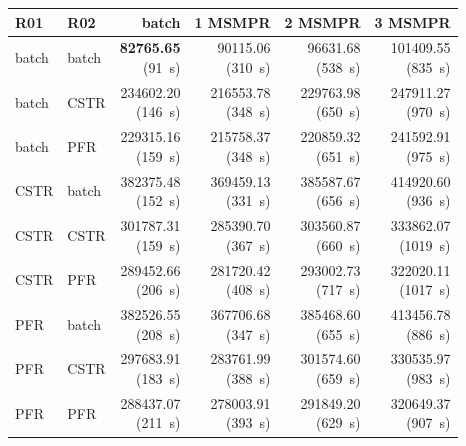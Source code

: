 \begin{tabular}{@{}llrrrr@{}}\toprule
R01 & R02 & batch & 1 MSMPR & 2 MSMPR & 3 MSMPR\\\midrule
batch & batch & \makecell{\textbf{82765.65}\\(91~s)} & \makecell{90115.06\\(310~s)} & \makecell{96631.68\\(538~s)} & \makecell{101409.55\\(835~s)} \\
batch & CSTR & \makecell{234602.20\\(146~s)} & \makecell{216553.78\\(348~s)} & \makecell{229763.98\\(650~s)} & \makecell{247911.27\\(970~s)} \\
batch & PFR & \makecell{229315.16\\(159~s)} & \makecell{215758.37\\(348~s)} & \makecell{220859.32\\(651~s)} & \makecell{241592.91\\(975~s)} \\
CSTR & batch & \makecell{382375.48\\(152~s)} & \makecell{369459.13\\(331~s)} & \makecell{385587.67\\(656~s)} & \makecell{414920.60\\(936~s)} \\
CSTR & CSTR & \makecell{301787.31\\(159~s)} & \makecell{285390.70\\(367~s)} & \makecell{303560.87\\(660~s)} & \makecell{333862.07\\(1019~s)} \\
CSTR & PFR & \makecell{289452.66\\(206~s)} & \makecell{281720.42\\(408~s)} & \makecell{293002.73\\(717~s)} & \makecell{322020.11\\(1017~s)} \\
PFR & batch & \makecell{382526.55\\(208~s)} & \makecell{367706.68\\(347~s)} & \makecell{385468.60\\(655~s)} & \makecell{413456.78\\(886~s)} \\
PFR & CSTR & \makecell{297683.91\\(183~s)} & \makecell{283761.99\\(388~s)} & \makecell{301574.60\\(659~s)} & \makecell{330535.97\\(983~s)} \\
PFR & PFR & \makecell{288437.07\\(211~s)} & \makecell{278003.91\\(393~s)} & \makecell{291849.20\\(629~s)} & \makecell{320649.37\\(907~s)} \\
\bottomrule\end{tabular}
